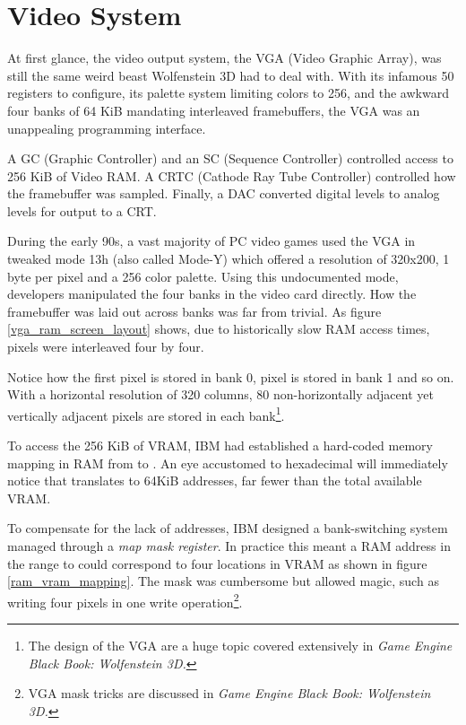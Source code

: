 \section{Video System}
At first glance, the video output system, the VGA (Video Graphic Array), was still the same weird beast Wolfenstein 3D had to deal with. With its infamous 50 registers to configure, its palette system limiting colors to 256, and the awkward four banks of 64 KiB mandating interleaved framebuffers, the VGA was an unappealing programming interface.\\
\par
A GC (Graphic Controller) and an SC (Sequence Controller) controlled access to 256 KiB of Video RAM. A CRTC (Cathode Ray Tube Controller) controlled how the framebuffer was sampled. Finally, a DAC converted digital levels to analog levels for output to a CRT.\\
\par 	
{}
\par
During the early 90s, a vast majority of PC video games used the VGA in tweaked mode 13h (also called Mode-Y) which offered a resolution of 320x200, 1 byte per pixel and a 256 color palette. Using this undocumented mode, developers manipulated the four banks in the video card directly. How the framebuffer was laid out across banks was far from trivial. As figure \ref{vga_ram_screen_layout} shows, due to historically slow RAM access times, pixels were interleaved four by four.




\par

Notice how the first pixel  is stored in bank 0, pixel  is stored in bank 1 and so on. With a horizontal resolution of 320 columns, 80 non-horizontally adjacent yet vertically adjacent pixels are stored in each bank\footnote{The design of the VGA are a huge topic covered extensively in \it{Game Engine Black Book: Wolfenstein 3D}.}.\\
\par
To access the 256 KiB of VRAM, IBM had established a hard-coded memory mapping in RAM from  to . An eye accustomed to hexadecimal will immediately notice that  translates to 64KiB addresses, far fewer than the total available VRAM.\\
\par
 To compensate for the lack of addresses, IBM designed a bank-switching system managed through a \textit{map mask register}. In practice this meant a RAM address in the range  to  could correspond to four locations in VRAM as shown in figure \ref{ram_vram_mapping}. The mask was cumbersome but allowed magic, such as writing four pixels in one write operation\footnote{VGA mask tricks are discussed in \it{Game Engine Black Book: Wolfenstein 3D}.}.

